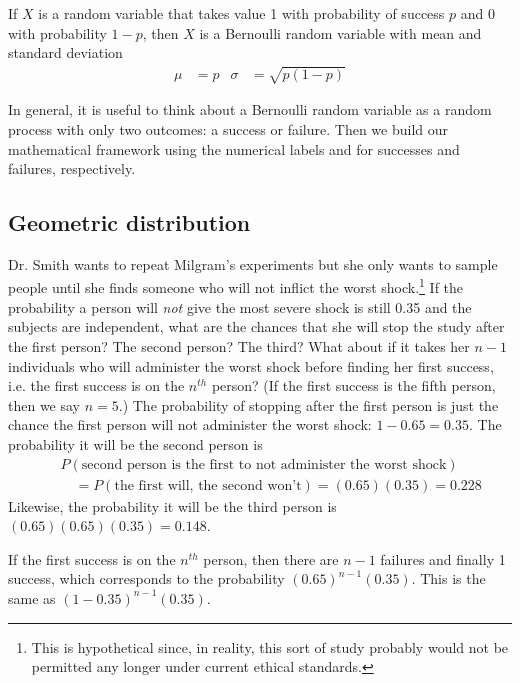 \begin{termBox}{
If $X$ is a random variable that takes value 1 with probability of success $p$ and 0 with probability $1-p$, then $X$ is a Bernoulli random variable with mean and standard deviation
\begin{align*}
\mu &= p
	&\sigma&= \sqrt{p(1-p)}
\end{align*}}
\end{termBox}

In general, it is useful to think about a Bernoulli random variable as a random process with only two outcomes: a success or failure. Then we build our mathematical framework using the numerical labels  and  for successes and failures, respectively.


\subsection{Geometric distribution}


\begin{example}{Dr. Smith wants to repeat Milgram's experiments but she only wants to sample people until she finds someone who will not inflict the worst shock.\footnote{This is hypothetical since, in reality, this sort of study probably would not be permitted any longer under current ethical standards.} If the probability a person will \emph{not} give the most severe shock is still 0.35 and the subjects are independent, what are the chances that she will stop the study after the first person? The second person? The third? What about if it takes her $n-1$ individuals who will administer the worst shock before finding her first success, i.e. the first success is on the $n^{th}$ person? (If the first success is the fifth person, then we say $n=5$.)} \label{waitForShocker}
The probability of stopping after the first person is just the chance the first person will not administer the worst shock: $1-0.65=0.35$. The probability it will be the second person is
\begin{eqnarray*}
&&P(\text{second person is the first to not administer the worst shock}) \\
&&\quad = P(\text{the first will, the second won't}) = (0.65)(0.35) = 0.228
\end{eqnarray*}
Likewise, the probability it will be the third person is $(0.65)(0.65)(0.35) = 0.148$.

If the first success is on the $n^{th}$ person, then there are $n-1$ failures and finally 1 success, which corresponds to the probability $(0.65)^{n-1}(0.35)$. This is the same as $(1-0.35)^{n-1}(0.35)$.
\end{example}

